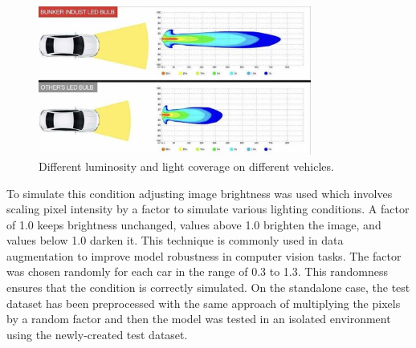 \begin{figure}[H]
    \centering
    \includegraphics[width=0.8\textwidth]{images/figure10.png}
    \caption{Different luminosity and light coverage on different vehicles.}
    \label{fig:fig9}
  \end{figure}

  To simulate this condition adjusting image brightness was used which involves scaling pixel 
  intensity by a factor to simulate various lighting conditions. 
  A factor of 1.0 keeps brightness unchanged, values above 1.0 brighten the image, and values below 1.0 darken it.
   This technique is commonly used in data augmentation to improve model robustness in computer vision tasks.
   The factor was chosen randomly for each car in the range of 0.3 to 1.3. This randomness ensures that the condition is 
   correctly simulated.
   On the standalone case, the test dataset has been preprocessed with the same approach of multiplying the pixels by a random
   factor and then the model was tested in an isolated environment using the newly-created test dataset. 

